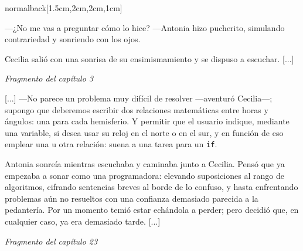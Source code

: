 \documentclass[coverheight=210mm,coverwidth=148.5mm, bleedwidth=13mm,
spinewidth=13mm, foldingmargin, marklength=4mm, 11pt]{bookcover}
\begin{document}
\begin{bookcover}
\begin{bookcoverelement}{normal}{back}[1.5cm,2cm,2cm,1cm]
{      \hspace{.5em} ---¿No me vas a preguntar cómo lo hice? ---Antonia
      hizo pucherito, simulando contrariedad y sonriendo con los ojos.

      \hspace{.5em} Cecilia salió con una sonrisa de su
      ensimismamiento y se dispuso a escuchar. [...]
  

  \begin{flushright}
    \emph{Fragmento del capítulo 3}
  \end{flushright}

  \vspace{2.5em}
  
  \hspace{.5em} [...] ---No parece un problema muy difícil de resolver
  ---a\-ven\-tu\-ró Cecilia---; supongo que deberemos escribir dos
  relaciones matemáticas entre horas y ángulos: una para cada
  hemisferio. Y permitir que el usuario indique, mediante una
  variable, si desea usar su reloj en el norte o en el sur, y en
  función de eso emplear una u otra relación: suena a una tarea para
  un \texttt{if}.

  \hspace{.5em} Antonia sonreía mientras escuchaba y caminaba junto a
  Cecilia. Pensó que ya empezaba a sonar como una programadora:
  elevando suposiciones al rango de algoritmos, cifrando sentencias
  breves al borde de lo confuso, y hasta enfrentando problemas aún no
  resueltos con una confianza demasiado parecida a la pedantería. Por
  un momento temió estar echándola a perder; pero decidió que, en
  cualquier caso, ya era demasiado tarde. [...]

  \begin{flushright}
    \emph{Fragmento del capítulo 23}
  \end{flushright}
}
  
  \end{bookcoverelement}


\end{bookcover}
\end{document}
